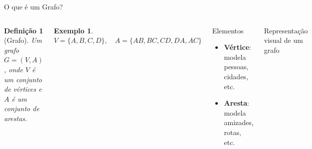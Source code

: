 \documentclass[10pt]{beamer}
\newtheorem{definicao}{Definição}
\newtheorem{exemplo}{Exemplo}
\begin{document}
\begin{frame}{O que \'{e} um Grafo?}
\transdissolve 
\begin{columns}[T]
\begin{definicao}[Grafo]
\small
Um grafo $G = (V, A)$, onde $V$ \'{e} um conjunto de v\'{e}rtices e $A$ \'{e} um conjunto de arestas.
\end{definicao}
\vspace{0.2cm}
\begin{exemplo}
\small
$V = \{A, B, C, D\}, \quad A = \{AB, BC, CD, DA, AC\}$
\end{exemplo}
\vspace{0.2cm}
\begin{block}{Elementos}
\small
\begin{itemize}
    \setlength{\itemsep}{0pt}
    \item \textbf{V\'{e}rtice}: modela pessoas, cidades, etc.
    \item \textbf{Aresta}: modela amizades, rotas, etc.
\end{itemize}
\end{block}
\centering
{}
\vspace{0.2cm}
{\scriptsize Representa\c{c}\~{a}o visual de um grafo}
\end{columns}
\end{frame}
\end{document}
